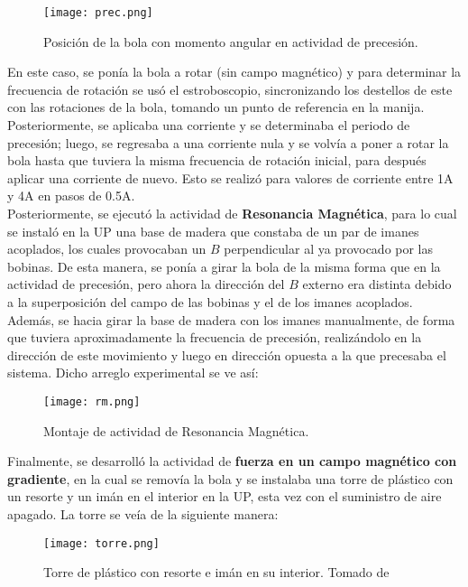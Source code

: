 \documentclass[%
 reprint,
 amsmath,amssymb,
 aps,
]{revtex4-1}
\begin{document}
\begin{figure}[H]
    \centering
    \texttt{[image: prec.png]}
    \caption{Posición de la bola con momento angular en actividad de precesión. \cite{guia}}
    \label{fig:grafica3}
\end{figure}

En este caso, se ponía la bola a rotar (sin campo magnético) y para determinar la frecuencia de rotación se usó el estroboscopio, sincronizando los destellos de este con las rotaciones de la bola, tomando un punto de referencia en la manija. Posteriormente, se aplicaba una corriente y se determinaba el periodo de precesión; luego, se regresaba a una corriente nula y se volvía a poner a rotar la bola hasta que tuviera la misma frecuencia de rotación inicial, para después aplicar una corriente de nuevo. Esto se realizó para valores de corriente entre 1A y 4A en pasos de 0.5A.\\
Posteriormente, se ejecutó la actividad de \textbf{Resonancia Magnética}, para lo cual se instaló en la UP una base de madera que constaba de un par de imanes acoplados, los cuales provocaban un $B$ perpendicular al ya provocado por las bobinas. De esta manera, se ponía a girar la bola de la misma forma que en la actividad de precesión, pero ahora la dirección del $B$ externo era distinta debido a la superposición del campo de las bobinas y el de los imanes acoplados. Además, se hacia girar la base de madera con los imanes manualmente, de forma que tuviera aproximadamente la frecuencia de precesión, realizándolo en la dirección de este movimiento y luego en dirección opuesta a la que precesaba el sistema. Dicho arreglo experimental se ve así:

\begin{figure}[H]
    \centering
    \texttt{[image: rm.png]}
    \caption{Montaje de actividad de Resonancia Magnética. \cite{guia}}
    \label{fig:grafica4}
\end{figure}

Finalmente, se desarrolló la actividad de \textbf{fuerza en un campo magnético con gradiente}, en la cual se removía la bola y se instalaba una torre de plástico con un resorte y un imán en el interior en la UP, esta vez con el suministro de aire apagado. La torre se veía de la siguiente manera:

\begin{figure}[H]
    \centering
    \texttt{[image: torre.png]}
    \caption{Torre de plástico con resorte e imán en su interior. Tomado de \cite{guia}}
    \label{fig:grafica4}
\end{figure}
\end{document}
